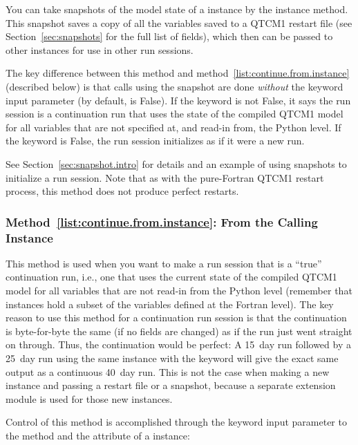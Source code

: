 You can take snapshots of the model state of a  instance
by the  instance method.  This snapshot saves
a copy of all the variables saved to a QTCM1 restart file (see
Section~\ref{sec:snapshots} for the full list of fields), which
then can be passed to other  instances for use in other
run sessions.

The key difference between this method and 
method~\ref{list:continue.from.instance} (described below)
is that  calls using the snapshot are done
\emph{without} the  keyword input parameter
(by default,  is False).  If the  keyword
is not False, it says the run session is a continuation run
that uses the state of the compiled QTCM1 model for all variables
that are not specified at, and read-in from,
the Python level.  If the  keyword
is False, the run session initializes as if it were a new run.

See Section~\ref{sec:snapshot.intro} for details and
an example of using snapshots to initialize a run session.
Note that as with the pure-Fortran QTCM1 restart process, this method 
does not produce perfect restarts.


		\subsubsection{Method~\ref{list:continue.from.instance}:
			From the Calling  Instance}

This method is used when you want to make a run session that is a
``true'' continuation run, i.e., one that uses the current state
of the compiled QTCM1 model for all variables that are not read-in
from the Python level (remember that  instances hold a
subset of the variables defined at the Fortran level).  
The key reason to use this method for a continuation run session
is that the continuation is byte-for-byte the same (if no fields
are changed) as if the run just went straight on through.  Thus,
the continuation would be perfect: A 15~day run followed by a 25~day
run using the same  instance with the  keyword
will give the exact same output as a continuous 40~day run.  This
is not the case when making a new instance and passing a restart
file or a snapshot, because a separate extension module is used for
those new instances.

Control of this method is accomplished through the 
keyword input parameter to the  method and the
 attribute of a
 instance:

